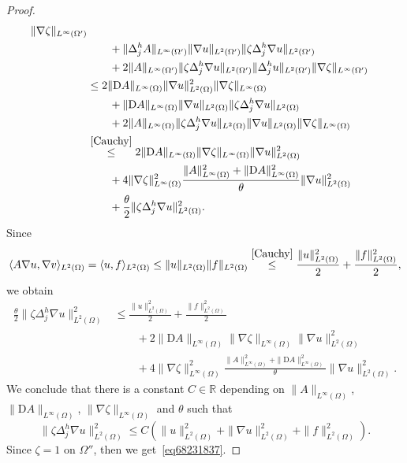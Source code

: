 \documentclass[a4paper,9pt]{amsart}
\newcommand{\R}{\mathbb{R}}	%
\newcommand{\Diff}{\mathrm{D}}
\newcommand{\grad}{\nabla}
\theoremstyle{plain}
\theoremstyle{definition}
\theoremstyle{remark}
\begin{document}
\begin{proof}
\begin{align}
			\| \grad\zeta \|_{L^\infty(\Omega')} \\
		&\qquad	+ \|\Delta_j^{h}A\|_{L^\infty(\Omega')} \|\grad u \|_{L^2(\Omega')} \| \zeta\Delta_j^h \grad u\|_{L^2(\Omega')} \\
		&\qquad	+ 2 \|A\|_{L^\infty(\Omega')} \|\zeta\Delta_j^{h}\grad u\|_{L^2(\Omega')} \| \Delta_j^h u\|_{L^2(\Omega')} 
			\| \grad\zeta \|_{L^\infty(\Omega')} \\
		&\le 2 \|\Diff A\|_{L^\infty(\Omega)} \|\grad u \|_{L^2(\Omega)}^2 \| \grad\zeta \|_{L^\infty(\Omega)} \\
		&\qquad	+ \|\Diff A\|_{L^\infty(\Omega)} \|\grad u \|_{L^2(\Omega)} \|\zeta\Delta_j^{h}\grad u\|_{L^2(\Omega)} \\
		&\qquad	+ 2 \|A\|_{L^\infty(\Omega)} \|\zeta\Delta_j^{h}\grad u\|_{L^2(\Omega)} \| \grad u\|_{L^2(\Omega)} 
			\| \grad\zeta \|_{L^\infty(\Omega)} \\
		&\overset{\eqref{Cauchy}}\le 2 \|\Diff A\|_{L^\infty(\Omega)} \| \grad\zeta \|_{L^\infty(\Omega)} \|\grad u \|_{L^2(\Omega)}^2\\
		&\qquad		+ 4\| \grad\zeta \|_{L^\infty(\Omega)}^2 \frac{ \|A\|_{L^\infty(\Omega)}^2 +  \|\Diff A\|_{L^\infty(\Omega)}^2 }{ \theta } \| \grad u\|_{L^2(\Omega)}^2 \\
		&\qquad	+ \frac{\theta}{2} \|\zeta \Delta_j^{h}\grad u\|_{L^2(\Omega)}^2 .
	\end{align}
	Since
	\begin{equation}
		\langle A\grad u,\grad v \rangle_{L^2(\Omega)} 
		= \langle u,f \rangle_{L^2(\Omega)}\le \|u\|_{L^2(\Omega)}\|f\|_{L^2(\Omega)} 
		\overset{\eqref{Cauchy}}\le \frac{ \|u\|_{L^2(\Omega)}^2 }{2} + \frac{ \|f\|_{L^2(\Omega)}^2 }{2} ,
	\end{equation}
	we obtain
	\begin{align}
		\frac{\theta}{2} \|\zeta \Delta_j^{h}\grad u\|_{L^2(\Omega)}^2
		&\le \frac{ \|u\|_{L^2(\Omega)}^2 }{2} + \frac{ \|f\|_{L^2(\Omega)}^2 }{2} \\
		&\qquad	+ 2 \|\Diff A\|_{L^\infty(\Omega)} \| \grad\zeta \|_{L^\infty(\Omega)} \|\grad u \|_{L^2(\Omega)}^2 \\
		&\qquad	+ 4\| \grad\zeta \|_{L^\infty(\Omega)}^2 \frac{ \|A\|_{L^\infty(\Omega)}^2 +  \|\Diff A\|_{L^\infty(\Omega)}^2 }{ \theta } \| \grad u\|_{L^2(\Omega)}^2 .
	\end{align}
	We conclude that there is a constant $C\in\R$ depending on $\| A\|_{L^\infty(\Omega)}$, $\|\Diff A\|_{L^\infty(\Omega)}$, $\| \grad\zeta \|_{L^\infty(\Omega)}$ and $\theta$ such that
	\begin{equation}
		\|\zeta \Delta_j^{h}\grad u\|_{L^2(\Omega)}^2 \le C ( \|u\|_{L^2(\Omega)}^2 + \| \grad u\|_{L^2(\Omega)}^2 + \|f\|_{L^2(\Omega)}^2 ) .
	\end{equation}
	Since $\zeta=1$ on $\Omega''$, then we get~\eqref{eq68231837}.
\end{proof}
\end{document}
